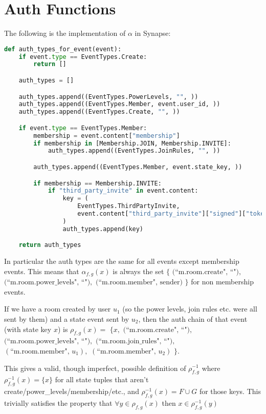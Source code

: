 \documentclass{article}
\begin{document}
\section{Auth Functions}

\begin{minipage}{\textwidth}

The following is the implementation of $\alpha$ in Synapse:

\begin{lstlisting}[language=Python, frame=tb, caption={Definition of $\alpha$},basicstyle=\small]
def auth_types_for_event(event):
    if event.type == EventTypes.Create:
        return []

    auth_types = []

    auth_types.append((EventTypes.PowerLevels, "", ))
    auth_types.append((EventTypes.Member, event.user_id, ))
    auth_types.append((EventTypes.Create, "", ))

    if event.type == EventTypes.Member:
        membership = event.content["membership"]
        if membership in [Membership.JOIN, Membership.INVITE]:
            auth_types.append((EventTypes.JoinRules, "", ))

        auth_types.append((EventTypes.Member, event.state_key, ))

        if membership == Membership.INVITE:
            if "third_party_invite" in event.content:
                key = (
                    EventTypes.ThirdPartyInvite,
                    event.content["third_party_invite"]["signed"]["token"]
                )
                auth_types.append(key)

    return auth_types
\end{lstlisting}
\end{minipage}

In particular the auth types are the same for all events except membership events. This means that $\alpha_{f,g}(x)$ is always the set $\{$ $\text{(``m.room.create", ``")},$ $\text{(``m.room.power\_levels", ``")}, $ $\text{(``m.room.member", sender)}$ $\}$ for non membership events.

If we have a room created by user $u_1$ (so the power levels, join rules etc. were all sent by them) and a state event sent by $u_2$, then the auth chain of that event (with state key $x$) is $\rho_{f,g}(x) = $ $\{ x,$ $\text{(``m.room.create", ``")},$ $\text{(``m.room.power\_levels", ``")}, $ $\text{(``m.room.join\_rules", ``")},$ $(\text{``m.room.member", } u_1), $ $(\text{``m.room.member", } u_2 )$ $ \}$.

This gives a valid, though imperfect, possible definition of $\rho_{f,g}^{-1}$ where $\rho_{f,g}^{-1}(x) = \{x\}$ for all state tuples that aren't create/power\_levels/membership/etc., and $\rho_{f,g}^{-1}(x) = F \cup G$ for those keys. This trivially satisfies the property that $\forall y \in \rho_{f,g}(x)$ then $x \in \rho_{f,g}^{-1}(y)$
\end{document}
